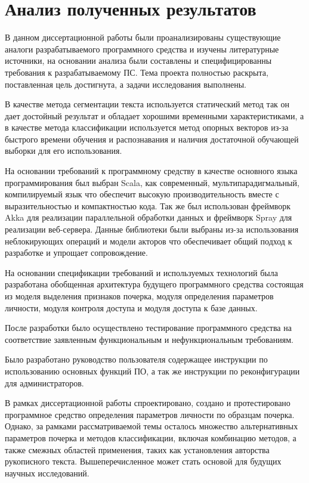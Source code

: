 \section{Анализ полученных результатов}
\label{sec:summary}

В данном диссертационной работы были проанализированы существующие аналоги разрабатываемого программного средства и изучены литературные источники, на основании анализа были составлены и специфицированны требования к разрабатываемому ПС. Тема проекта полностью раскрыта, поставленная цель достигнута, а задачи исследования выполнены.

В качестве метода сегментации текста используется статический метод так он дает достойный результат и обладает хорошими временными характеристиками, а в качестве метода классификации используется метод опорных векторов из-за быстрого времени обучения и распознавания и наличия достаточной обучающей выборки для его использования.

На основании требований к программному средству в качестве основного языка программирования был выбран Scala, как современный, мультипарадигмальный, компилируемый язык что обеспечит высокую производительность вместе с выразительностью и компактностью кода. Так же был использован фреймворк Akka для реализации параллельной обработки данных и фреймворк Spray для реализации веб-сервера. Данные библиотеки были выбраны из-за использования неблокирующих операций и модели акторов что обеспечивает общий подход к разработке и упрощает сопровождение.

На основании спецификации требований и используемых технологий была разработана обобщенная архитектура будущего программного средства состоящая из моделя выделения признаков почерка, модуля определения параметров личности, модуля контроля доступа и модуля доступа к базе данных.

После разработки было осуществлено тестирование программного средства на соответствие заявленным функциональным и нефункциональным требованиям.

Было разработано руководство пользователя содержащее инструкции по использованию основных функций ПО, а так же инструкции по реконфигурации для администраторов.

В рамках диссертационной работы спроектировано, создано и протестировано программное средство определения параметров личности по образцам почерка. Однако, за рамками рассматриваемой темы осталось множество альтернативных параметров почерка и методов классификации, включая комбинацию методов, а также смежных областей применения, таких как установления авторства рукописного текста. Вышеперечисленное может стать основой для будущих научных исследований.

